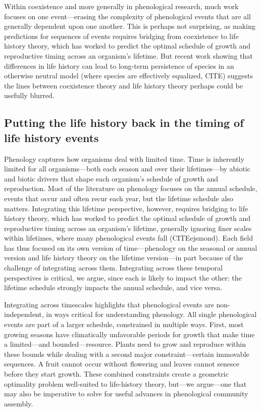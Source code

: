 \documentclass[11pt]{article}
\begin{document}



Within coexistence and more generally in phenological research, much work focuses on one event---erasing the complexity of phenological events that are all generally dependent upon one another. This is perhaps not surprising, as making predictions for sequences of events requires bridging from coexistence to life history theory, which has worked to predict the optimal schedule of growth and reproductive timing across an organism's lifetime. But recent work showing that differences in life history can lead to long-term persistence of species in an otherwise neutral model (where species are effectively equalized, CITE) suggests the lines between coexistence theory and life history theory perhaps could be usefully blurred. 


\subsection*{Putting the life history back in the timing of life history events}

Phenology captures how organisms deal with limited time. Time is inherently limited for all organisms---both each season and over their lifetimes---by abiotic and biotic drivers that shape each organism's schedule of growth and reproduction. Most of the literature on phenology focuses on the annual schedule, events that occur and often recur each year, but the lifetime schedule also matters. Integrating this lifetime perspective, however, requires bridging to life history theory, which has worked to predict the optimal schedule of growth and reproductive timing across an organism's lifetime, generally ignoring finer scales within lifetimes, where many phenological events fall (CITEejsmond). Each field has thus focused on its own version of time---phenology on the seasonal or annual version and life history theory on the lifetime version---in part because of the challenge of integrating across them. Integrating across these temporal perspectives is critical, we argue, since each is likely to impact the other: the lifetime schedule strongly impacts the annual schedule, and vice versa. 

Integrating across timescales highlights that phenological events are non-independent, in ways critical for understanding phenology. All single phenological events are part of a larger schedule, constrained in multiple ways. First, most growing seasons have climatically unfavorable periods for growth that make time a limited---and bounded---resource. Plants need to grow and reproduce within these bounds while dealing with a second major constraint---certain immovable sequences. A fruit cannot occur without flowering and leaves cannot senesce before they start growth. These combined constraints create a geometric optimality problem well-suited to life-history theory, but---we argue---one that may also be imperative to solve for useful advances in phenological community assembly.
\end{document}
